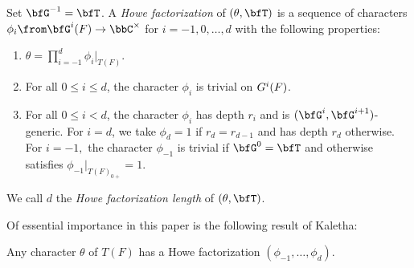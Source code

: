 \begin{definition}\label{def:Howe}
  Set $\bfG^{-1} = \bfT$. 
  A \textit{Howe factorization} of $(\theta,\bfT)$ is a sequence of characters $\phi_i \from \bfG^i(F) \to \bbC^\times$ for $i = -1,0, \ldots, d$ with the following properties:
  \begin{enumerate}
    \item $\theta = \prod_{i=-1}^d \phi_i|_{T(F)}$.
    \item For all $0 \leq i \leq d$, the character $\phi_i$ is trivial on $G_{\sc}^i(F)$.
    \item For all $0 \leq i < d$, the character $\phi_i$ has depth $r_i$ and is $(\bfG^i,\bfG^{i+1})$-generic. For $i = d$, we take $\phi_d = 1$ if $r_d = r_{d-1}$ and has depth $r_d$ otherwise. For $i = -1,$ the character $\phi_{-1}$ is trivial if $\bfG^0 = \bfT$ and otherwise satisfies $\phi_{-1}|_{T(F)_{0+}} = 1$.
  \end{enumerate}
  We call $d$ the \textit{Howe factorization length} of $(\theta,\bfT)$.
\end{definition}

Of essential importance in this paper is the following result of Kaletha:

\begin{theorem}\label{thm:Howe}
  Any character $\theta$ of $T(F)$ has a Howe factorization $(\phi_{-1}, \ldots, \phi_d)$.
\end{theorem}

